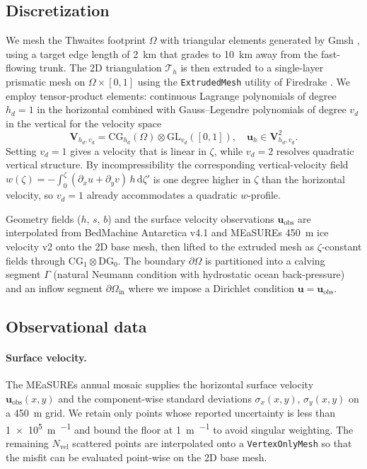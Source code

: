 \subsection{Discretization}
\label{sec:discretization}

We mesh the Thwaites footprint $\Omega$ with triangular elements
generated by Gmsh \citep{Geuzaine2009}, using a target edge length
of \SI{2}{\km} that grades to \SI{10}{\km} away from the
fast-flowing trunk. The 2D triangulation $\mathcal T_h$ is then
extruded to a single-layer prismatic mesh on
$\Omega\times[0,1]$ using the \texttt{ExtrudedMesh} utility of
Firedrake \citep{Rathgeber2016}. We employ tensor-product elements:
continuous Lagrange polynomials of degree $h_d=1$ in the horizontal
combined with Gauss--Legendre polynomials of degree $v_d$ in the
vertical for the velocity space
\begin{equation}
\bm V_{h_d, v_d} = \mathrm{CG}_{h_d}(\Omega)\otimes
                    \mathrm{GL}_{v_d}([0,1]),\quad
\bm u_h \in \bm V_{h_d, v_d}^2.
   \label{eq:vspace}
\end{equation}
Setting $v_d=1$ gives a velocity that is linear in $\zeta$, while
$v_d=2$ resolves quadratic vertical structure. By incompressibility
the corresponding vertical-velocity field
$w(\zeta) = -\!\int_0^\zeta(\partial_x u + \partial_y v)\,h\,
\mathrm d\zeta'$ is one degree higher in $\zeta$ than the horizontal
velocity, so $v_d=1$ already accommodates a quadratic
$w$-profile.

Geometry fields ($h$, $s$, $b$) and the surface velocity
observations $\bm u_\mathrm{obs}$ are interpolated from BedMachine
Antarctica v4.1 \citep{Morlighem2020} and MEaSUREs
\SI{450}{\m} ice velocity v2 \citep{Mouginot2019} onto the 2D base
mesh, then lifted to the extruded mesh as $\zeta$-constant fields
through $\mathrm{CG}_1\otimes\mathrm{DG}_0$. The boundary
$\partial\Omega$ is partitioned into a calving segment $\Gamma$
(natural Neumann condition with hydrostatic ocean back-pressure) and
an inflow segment $\partial\Omega_\mathrm{in}$ where we impose a
Dirichlet condition $\bm u = \bm u_\mathrm{obs}$.

\subsection{Observational data}
\label{sec:data}

\paragraph{Surface velocity.} The MEaSUREs annual mosaic supplies
the horizontal surface velocity $\bm u_\mathrm{obs}(x,y)$ and the
component-wise standard deviations $\sigma_x(x,y)$, $\sigma_y(x,y)$
on a \SI{450}{\m} grid. We retain only points whose reported
uncertainty is less than \SI{1e5}{\meter\per\year} and bound the
floor at \SI{1}{\meter\per\year} to avoid singular weighting. The
remaining $N_\mathrm{vel}$ scattered points are interpolated onto a
\texttt{VertexOnlyMesh} \citep{Nixon-Hill2024} so that the misfit can
be evaluated point-wise on the 2D base mesh.


